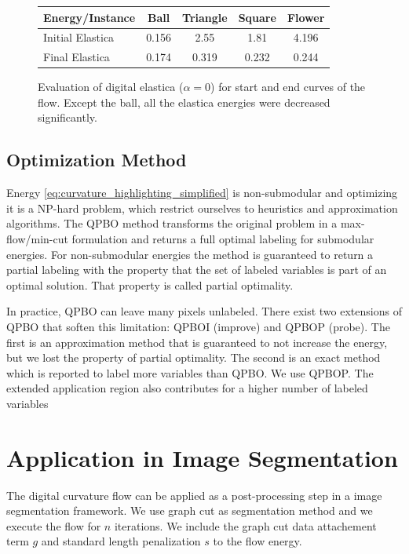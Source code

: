 \documentclass[runningheads]{llncs}
\begin{document}
\begin{figure}[!ht]
\center
\begin{tabular}{l|c|c|c|c}
	Energy/Instance & Ball & Triangle & Square & Flower\\
	\hline
	Initial Elastica & 0.156 & 2.55 & 1.81 & 4.196 \\
	Final Elastica & 0.174 & 0.319 & 0.232 & 0.244
\end{tabular}
\caption{Evaluation of digital elastica ($\alpha=0$) for start and end curves of the flow. Except the ball, all the elastica energies were decreased significantly.}
\label{tab:digital_glows_elastica_result}
\end{figure}

\subsection{Optimization Method}\label{sec:optimization_method}

	Energy \eqref{eq:curvature_highlighting_simplified} is non-submodular and optimizing it is a NP-hard problem, which restrict ourselves to heuristics and approximation algorithms. The QPBO method \cite{kolmogorov07} transforms the original problem in a max-flow/min-cut formulation and returns a full optimal labeling for submodular energies. For non-submodular energies the method is guaranteed to return a partial labeling with the property that the set of labeled variables is part of an optimal solution. That property is called partial optimality. 

	In practice, QPBO can leave many pixels unlabeled. There exist two extensions of QPBO that soften this limitation: QPBOI (improve) and QPBOP (probe). The first is an approximation method that is guaranteed to not increase the energy, but we lost the property of partial optimality. The second is an exact method which is reported to label more variables than QPBO. We use QPBOP. The extended application region also contributes for a higher number of labeled variables
	
\section{Application in Image Segmentation}

The digital curvature flow can be applied as a post-processing step in a image segmentation framework. We use graph cut \cite{boykov01} as segmentation method and we execute the flow for $n$ iterations. We include the graph cut data attachement term $g$ and standard length penalization $s$ to the flow energy.
\end{document}
